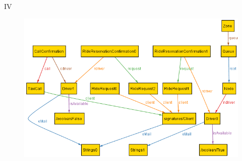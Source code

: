 \documentclass[9pt]{beamer}
\makeatletter
\newcommand*{\currentname}{\@currentlabelname}
\makeatother
\begin{document}
\begin{frame}{\currentname{} IV}
\begin{figure}[H]
\includegraphics[height=0.8\textheight]{Alloy-RideReservation}
\centering
\label{fig:alloyworldridereservation}
\end{figure}
\end{frame}
\end{document}
